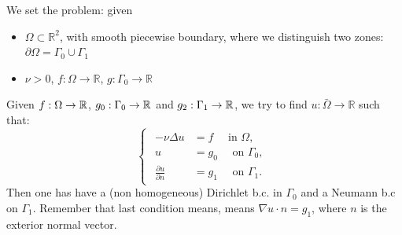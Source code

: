 \documentclass[12pt]{article}
\newcommand{\R}{{\mathbb R}}
\begin{document}
We set the problem: given
\begin{itemize}
\item $\Omega\subset\R^2$, with smooth piecewise boundary, where we
  distinguish two zones:
  $\partial\Omega=\Gamma_0\cup\Gamma_1$
\item $\nu>0$, \quad $f:\Omega\to\R$, \quad $g:\Gamma_0\to\R$
\end{itemize}
Given $f: \Omega \to {\mathbb R}$, $g_0:\Gamma_0\to{\mathbb R}$ and
$g_2:\Gamma_1\to{\mathbb R}$, we try to find $u:\bar\Omega \rightarrow \R$
such that:
\begin{equation}
  \label{eq:poisson-mixto}
  \begin{cases}
    \begin{aligned}
      -\nu\Delta u &= f \quad \text{ in } \Omega, \\
      u &= g_0 \quad \text{ on } \Gamma_0, \\
      \frac{\partial u}{\partial n} &= g_1 \quad \text{ on } \Gamma_1.
    \end{aligned}
  \end{cases}
\end{equation}
Then one has have a (non homogeneous) Dirichlet b.c. in $\Gamma_0$ and
a Neumann b.c on $\Gamma_1$. Remember that last condition means, means
$\nabla u \cdot n=g_1$, where $n$ is the exterior normal vector.
\end{document}
